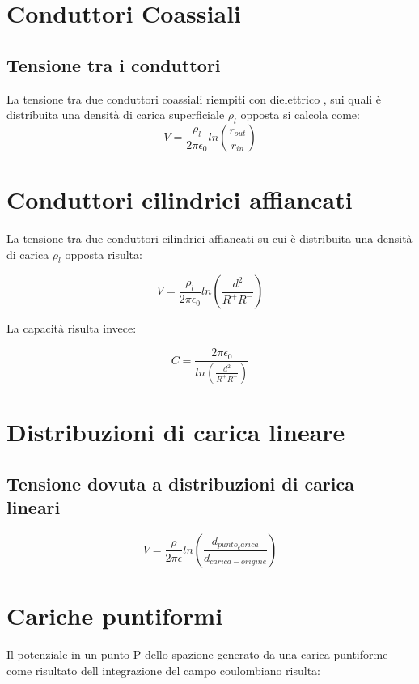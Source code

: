 \documentclass[10pt,a4paper]{report}
\begin{document}
	\section{Conduttori Coassiali}
		\subsection{Tensione tra i conduttori}

		La tensione tra due conduttori coassiali riempiti con dielettrico , sui quali è distribuita una densità di carica superficiale $\rho_l$ opposta si calcola come:
		 \begin{equation}
		 V= \frac {\rho_l}  {2 \pi \epsilon_0} ln ( \frac { r_{out} } { r_{in} } )
		 \end{equation}
	
	\section{Conduttori cilindrici affiancati}

		La tensione tra due conduttori cilindrici affiancati su cui è distribuita una densità di carica $\rho_l$ opposta risulta:

		\begin{equation}
		V=\frac{\rho_l}{2 \pi \epsilon_0}{ln(\frac{d^2}{R^+R^-})}
		\end{equation}

		La capacità risulta invece:

		\begin{equation}
		C=\frac{2 \pi \epsilon_0}{ln(\frac{d^2}{R^+R^-})}
		\end{equation}

	\section{Distribuzioni di carica lineare}

		\subsection{Tensione dovuta a distribuzioni di carica lineari}

		\[
		V=\frac{\rho}{2\pi \epsilon}ln(\frac{d_{punto_carica}}{d_{carica-origine}})
		\]
	\section{Cariche puntiformi}

		Il potenziale in un punto P dello spazione generato da una carica puntiforme come risultato dell integrazione del campo coulombiano risulta:
\end{document}
